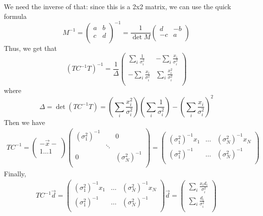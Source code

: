 \documentclass[a4paper,11pt,fleqn]{article}
\begin{document}
We need the inverse of that: since this is a 2x2 matrix, we can use the 
quick formula 
\begin{equation}
    M^{-1} = 
    \begin{pmatrix}
        a & b \\
        c & d \\
    \end{pmatrix}^{-1}
    = \frac{1}{\det M}
    \begin{pmatrix}
        d & -b \\
        -c & a \\
    \end{pmatrix}
\end{equation}
Thus, we get that 
\begin{equation}
    \label{eqn:cov_par}
    (TC^{-1}T)^{-1} = \frac{1}{\Delta}
    \begin{pmatrix}
        \sum_i \frac{1}{\sigma_i^2} & -\sum_i \frac{x_i}{\sigma_i^2} \\
        -\sum_i \frac{x_i}{\sigma_i^2} & \sum_i \frac{x_i^2}{\sigma_i^2} \\
    \end{pmatrix}
\end{equation}
where 
\begin{equation}
    \Delta = \det(TC^{-1}T) = \left(\sum_i\frac{x_i^2}{\sigma_i^2}\right)\left(\sum_i\frac{1}{\sigma_i^2}\right)-\left(\sum_i\frac{x_i}{\sigma_i^2}\right)^2
\end{equation}
Then we have 
\begin{gather*}
    TC^{-1} = 
    \begin{pmatrix}
        -\vec{x}- \\
        1 \dotsc 1 \\
    \end{pmatrix}
    \begin{pmatrix}
        (\sigma_1^2)^{-1} &  & 0\\
        & \ddots & \\
        0 & & (\sigma_N^2)^{-1} \\
    \end{pmatrix}
    = 
    \begin{pmatrix}
        (\sigma_1^2)^{-1}x_1 & \dotsc & (\sigma_N^2)^{-1}x_N \\
        (\sigma_1^2)^{-1} & \dotsc  & (\sigma_N^2)^{-1} \\
    \end{pmatrix}
\end{gather*}
Finally, 
\begin{gather*}
    TC^{-1}\vec{d} = 
    \begin{pmatrix}
        (\sigma_1^2)^{-1}x_1 & \dotsc & (\sigma_N^2)^{-1}x_N \\
        (\sigma_1^2)^{-1} & \dotsc  & (\sigma_N^2)^{-1} \\
    \end{pmatrix} \vec{d} = 
    \begin{pmatrix}
        \sum_i \frac{x_i d_i}{\sigma_i^2} \\
        \sum_i \frac{d_i}{\sigma_i^2} \\
    \end{pmatrix}
\end{gather*}
\end{document}
